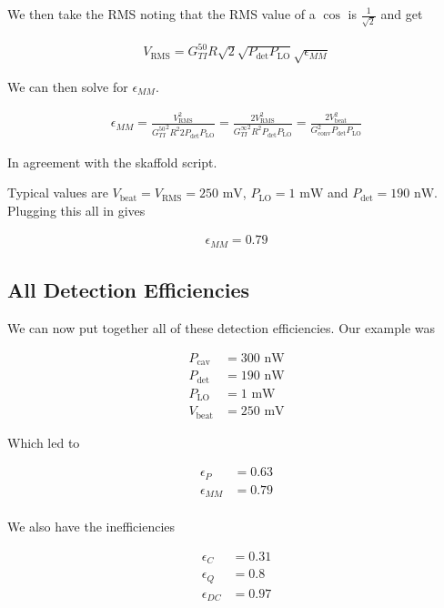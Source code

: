 \documentclass[12pt]{article}
\begin{document}
We then take the RMS noting that the RMS value of a $\cos$ is $\frac{1}{\sqrt{2}}$ and get

\begin{align}
V_{\text{RMS}} = G_{TI}^{50}R \sqrt{2} \sqrt{P_{\text{det}} P_{\text{LO}}} \sqrt{\epsilon_{MM}}
\end{align}

We can then solve for $\epsilon_{MM}$.

\begin{align}
\epsilon_{MM} = \frac{V_{\text{RMS}}^2}{{G_{TI}^{50}}^2 R^2 2 P_{\text{det}}P_{\text{LO}}} = \frac{2  V_{\text{RMS}}^2}{{G_{TI}^{\infty}}^2 R^2 P_{\text{det}}P_{\text{LO}}} = \frac{2 V_{\text{beat}}^2}{G_{\text{conv}}^2 P_{\text{det}} P_{\text{LO}}}
\end{align}

In agreement with the skaffold script.

Typical values are $V_{\text{beat}} = V_{\text{RMS}} = 250 \text{ mV}$, $P_{\text{LO}} = 1 \text{ mW}$ and $P_{\text{det}} = 190 \text{ nW}$. Plugging this all in gives

\begin{align}
\epsilon_{MM} = 0.79
\end{align}

\subsection{All Detection Efficiencies}

We can now put together all of these detection efficiencies. Our example was

\begin{align}
P_{\text{cav}} &=300 \text{ nW}\\
P_{\text{det}} &= 190 \text{ nW}\\
P_{\text{LO}} &= 1 \text{ mW}\\
V_{\text{beat}}&= 250 \text{ mV}
\end{align}

Which led to

\begin{align}
\epsilon_P &= 0.63\\
\epsilon_{MM} &= 0.79\\
\end{align}

We also have the inefficiencies

\begin{align}
\epsilon_C &= 0.31\\
\epsilon_Q &= 0.8\\
\epsilon_{DC} &= 0.97
\end{align}
\end{document}
